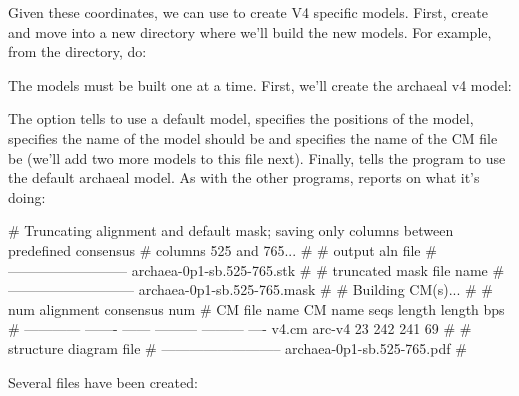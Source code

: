 Given these coordinates, we can use  to create V4
specific models. 
First, create and move into a new directory where we'll build the new
models. For example, from the  directory, do:


The models must be built one at a time. First, we'll
create the archaeal v4 model:


The  option tells  to use a default model,
 specifies the positions of the model, 
specifies the name of the model should be  and  specifies the name of the CM file be  (we'll add
two more models to this file next). Finally,  tells the
program to use the default archaeal model. As with the other programs,
 reports on what it's doing:

\begin{sreoutput}
# Truncating alignment and default mask; saving only columns between predefined consensus
# columns 525 and 765...
#
# output aln file           
# --------------------------
  archaea-0p1-sb.525-765.stk
#
# truncated mask file name   
# ---------------------------
  archaea-0p1-sb.525-765.mask
#
# Building CM(s)...
#
#                           num  alignment  consensus   num
# CM file name  CM name    seqs     length     length   bps
# ------------  -------  ------  ---------  ---------  ----
  v4.cm         arc-v4       23        242        241    69
#
# structure diagram file    
# --------------------------
  archaea-0p1-sb.525-765.pdf
#
\end{sreoutput}

Several files have been created:

